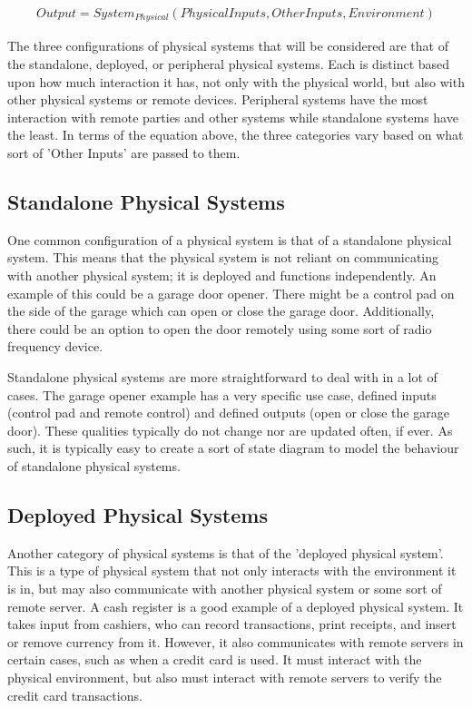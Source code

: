 \begin{align*}
Output = System_{Physical}(Physical Inputs, Other Inputs, Environment)
\end{align*}

The three configurations of physical systems that will be considered are that of the standalone, deployed, or peripheral physical
systems. Each is distinct based upon how much interaction it has, not only with the physical world, but also with other physical
systems or remote devices. Peripheral systems have the most interaction with remote parties and other systems while standalone
systems have the least. In terms of the equation above, the three categories vary based on what sort of 'Other Inputs' are passed
to them.

\subsection{Standalone Physical Systems}
One common configuration of a physical system is that of a standalone physical system. This means that the
physical system is not reliant on communicating with another physical system; it is deployed and functions
independently. An example of this could be a garage door opener. There might be a control pad on the side of the
garage which can open or close the garage door. Additionally, there could be an option to open the door remotely
using some sort of radio frequency device.

Standalone physical systems are more straightforward to deal with in a lot of cases. The garage opener example has
a very specific use case, defined inputs (control pad and remote control) and defined outputs (open or close the garage
door). These qualities typically do not change nor are updated often, if ever. As such, it is typically easy to create a sort
of state diagram to model the behaviour of standalone physical systems.

\subsection{Deployed Physical Systems}
Another category of physical systems is that of the 'deployed physical system'. This is a type of physical system that not only
interacts with the environment it is in, but may also communicate with another physical system or some sort of remote
server. A cash register is a good example of a deployed physical system. It takes input from cashiers, who can record transactions,
print receipts, and insert or remove currency from it. However, it also communicates with remote servers in certain cases, such
as when a credit card is used. It must interact with the physical environment, but also must interact with remote servers to verify
the credit card transactions.

